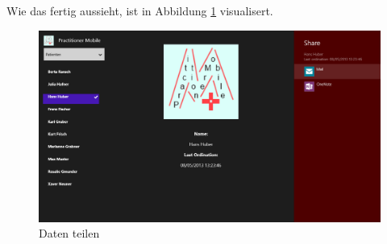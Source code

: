 \documentclass[a4paper,bibtotoc,oneside]{scrbook}
\begin{document}
Wie das fertig aussieht, ist in Abbildung \ref{img:share} visualisert.
\begin{figure}[htbp]
\centering
\includegraphics[scale=0.4]{images/share.png}
\caption[Daten teilen]{Daten teilen}\label{img:share}
\end{figure}
\end{document}
